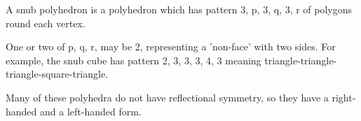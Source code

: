 A snub polyhedron is a polyhedron which has pattern {3, p, 3, q, 3, r} of
polygons round each vertex. 
\par
One or two of p, q, r, may be 2, representing a 'non-face' with two sides.
For example, the snub cube has pattern {2, 3, 3, 3, 4, 3} meaning 
triangle-triangle-triangle-square-triangle.
\par
Many of these polyhedra do not have
reflectional symmetry, so they have a right-handed and a left-handed
form.
